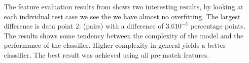 The feature evaluation results from  shows two interesting results, by looking at each individual test case we see the we have almost no overfitting. The largest difference is data point 2: (pairs) with a difference of $3.610^{-3}$ percentage points. The results shows some tendency between the complexity of the model and the performance of the classifier. Higher complexity in general yields a better classifier. The best result was achieved using all pre-match features.





